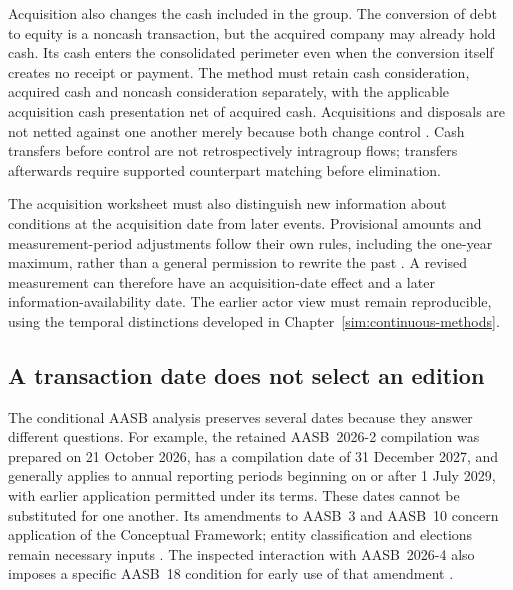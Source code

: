 Acquisition also changes the cash included in the group. The conversion of debt to equity is a noncash transaction, but the acquired company may already hold cash. Its cash enters the consolidated perimeter even when the conversion itself creates no receipt or payment. The method must retain cash consideration, acquired cash and noncash consideration separately, with the applicable acquisition cash presentation net of acquired cash. Acquisitions and disposals are not netted against one another merely because both change control \citep[paras.~39--44B]{aasb107acquisition2026}. Cash transfers before control are not retrospectively intragroup flows; transfers afterwards require supported counterpart matching before elimination.

The acquisition worksheet must also distinguish new information about conditions at the acquisition date from later events. Provisional amounts and measurement-period adjustments follow their own rules, including the one-year maximum, rather than a general permission to rewrite the past \citep[paras.~45--50]{aasb3scope2026}. A revised measurement can therefore have an acquisition-date effect and a later information-availability date. The earlier actor view must remain reproducible, using the temporal distinctions developed in Chapter~\ref{sim:continuous-methods}.

\subsection{A transaction date does not select an edition}

The conditional AASB analysis preserves several dates because they answer different questions. For example, the retained AASB~2026-2 compilation was prepared on 21 October 2026, has a compilation date of 31 December 2027, and generally applies to annual reporting periods beginning on or after 1 July 2029, with earlier application permitted under its terms. These dates cannot be substituted for one another. Its amendments to AASB~3 and AASB~10 concern application of the Conceptual Framework; entity classification and elections remain necessary inputs \citep[paras.~3, 18--19, 25; compilation details]{aasb2026frameworkcompiled}. The inspected interaction with AASB~2026-4 also imposes a specific AASB~18 condition for early use of that amendment \citep[paras.~3, 25]{aasb2026presentation}.

